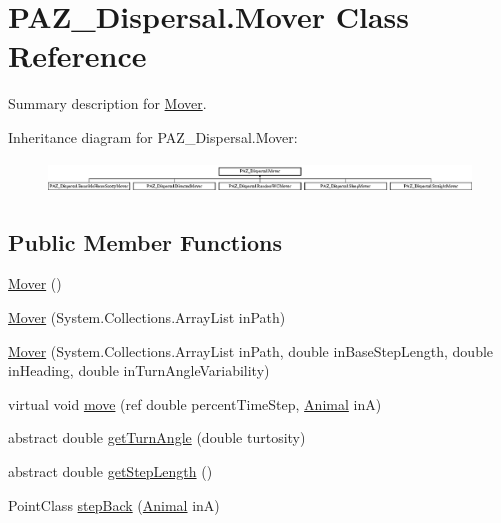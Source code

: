 \hypertarget{class_p_a_z___dispersal_1_1_mover}{\section{P\-A\-Z\-\_\-\-Dispersal.\-Mover Class Reference}
\label{class_p_a_z___dispersal_1_1_mover}
}


Summary description for \hyperlink{class_p_a_z___dispersal_1_1_mover}{Mover}.  


Inheritance diagram for P\-A\-Z\-\_\-\-Dispersal.\-Mover\-:\begin{figure}[H]
\begin{center}
\leavevmode
\includegraphics[height=0.851711cm]{class_p_a_z___dispersal_1_1_mover}
\end{center}
\end{figure}
\subsection*{Public Member Functions}
\begin{DoxyCompactItemize}
\item 
\hyperlink{class_p_a_z___dispersal_1_1_mover_a084321c15444d4f9ece413bdd821d218}{Mover} ()
\item 
\hyperlink{class_p_a_z___dispersal_1_1_mover_ab4d7fb3c0705104f1e221f1468c68851}{Mover} (System.\-Collections.\-Array\-List in\-Path)
\item 
\hyperlink{class_p_a_z___dispersal_1_1_mover_a9bf44066cbb10f7cffbe43866652317f}{Mover} (System.\-Collections.\-Array\-List in\-Path, double in\-Base\-Step\-Length, double in\-Heading, double in\-Turn\-Angle\-Variability)
\item 
virtual void \hyperlink{class_p_a_z___dispersal_1_1_mover_a04569135e604bce393016fe205025389}{move} (ref double percent\-Time\-Step, \hyperlink{class_p_a_z___dispersal_1_1_animal}{Animal} in\-A)
\item 
abstract double \hyperlink{class_p_a_z___dispersal_1_1_mover_a20c77beaeaf9673477d8977b017f93a2}{get\-Turn\-Angle} (double turtosity)
\item 
abstract double \hyperlink{class_p_a_z___dispersal_1_1_mover_a86979c836978688ee7bf111c6b69495f}{get\-Step\-Length} ()
\item 
Point\-Class \hyperlink{class_p_a_z___dispersal_1_1_mover_afa9bb1ebf2a3958ee6c10667c0a1ff86}{step\-Back} (\hyperlink{class_p_a_z___dispersal_1_1_animal}{Animal} in\-A)
\end{DoxyCompactItemize}

